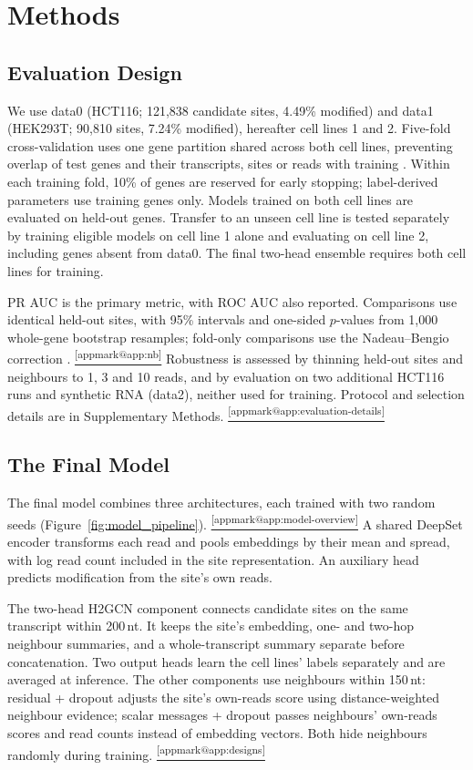 \documentclass[11pt,a4paper]{article}
\makeatletter
\DeclareRobustCommand{\applink}[1]{%
    \hyperref[#1]{\textsuperscript{\ref*{appmark@#1}}}}
\makeatother
\begin{document}
\section{Methods}
\subsection{Evaluation Design}
\label{sec:data}
We use data0 (HCT116; 121,838 candidate sites, 4.49\% modified) and data1
(HEK293T; 90,810 sites, 7.24\% modified), hereafter cell lines 1 and 2.
Five-fold cross-validation uses one gene partition shared across both cell
lines, preventing overlap of test genes and their transcripts, sites or reads
with training \citep{bbag434}. Within each training fold, 10\% of genes are
reserved for early stopping; label-derived parameters use training genes only.
Models trained on both cell lines are evaluated on held-out genes. Transfer
to an unseen cell line is tested separately by training eligible models on
cell line 1 alone and evaluating on cell line 2, including genes absent from
data0. The final two-head ensemble requires both cell lines for training.

PR AUC is the primary metric, with ROC AUC also reported. Comparisons use
identical held-out sites, with 95\% intervals and one-sided $p$-values from
1,000 whole-gene bootstrap resamples; fold-only comparisons use the
Nadeau--Bengio correction \citep{nadeau2003}.\applink{app:nb}
Robustness is assessed by thinning held-out sites and neighbours to 1, 3 and
10 reads, and by evaluation on two additional HCT116 runs and synthetic RNA
(data2), neither used for training. Protocol and selection details are in
Supplementary Methods.\applink{app:evaluation-details}

\subsection{The Final Model}
\label{sec:model}
The final model combines three architectures, each trained with two random
seeds (Figure~\ref{fig:model_pipeline}).\applink{app:model-overview} A shared DeepSet encoder
\citep{zaheer2017} transforms each read and pools embeddings by their mean
and spread, with log read count included in the site representation. An
auxiliary head predicts modification from the site's own reads.

The two-head H2GCN component \citep{zhu2020} connects candidate sites on the
same transcript within 200\,nt. It keeps the site's embedding, one- and
two-hop neighbour summaries, and a whole-transcript summary separate before
concatenation. Two output heads learn the cell lines' labels separately and
are averaged at inference. The other components use neighbours within
150\,nt: residual + dropout adjusts the site's own-reads score using
distance-weighted neighbour evidence; scalar messages + dropout passes
neighbours' own-reads scores and read counts instead of embedding vectors.
Both hide neighbours randomly during training.\applink{app:designs}
\end{document}
